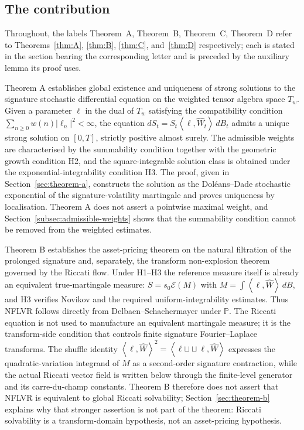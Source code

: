 \documentclass[11pt,oneside]{article}
\theoremstyle{plain}
\theoremstyle{definition}
\theoremstyle{remark}
\newcommand{\Pp}{\mathbb{P}}
\newcommand{\Tw}{T_w}
\newcommand{\cW}{\widehat W}
\newcommand{\sh}{\mathbin{\sqcup\!\sqcup}}
\newcommand{\abs}[1]{\left\lvert #1\right\rvert}
\newcommand{\inner}[2]{\left\langle #1,#2\right\rangle}
\begin{document}
\subsection{The contribution}

Throughout, the labels Theorem~A, Theorem~B, Theorem~C, Theorem~D refer
to Theorems~\ref{thm:A}, \ref{thm:B}, \ref{thm:C}, and~\ref{thm:D}
respectively; each is stated in the section bearing the corresponding
letter and is preceded by the auxiliary lemma its proof uses.

Theorem A establishes global existence and uniqueness of strong solutions to the signature stochastic differential equation on the weighted tensor algebra space $\Tw$. Given a parameter $\ell$ in the dual of $\Tw$ satisfying the compatibility condition $\sum_{n\geq0} w(n)\abs{\ell_n}^2<\infty$, the equation $dS_t=S_t\inner{\ell}{\cW_t}\,dB_t$ admits a unique strong solution on $[0,T]$, strictly positive almost surely. The admissible weights are characterised by the summability condition together with the geometric growth condition H2, and the square-integrable solution class is obtained under the exponential-integrability condition H3. The proof, given in Section~\ref{sec:theorem-a}, constructs the solution as the Dol\'eans--Dade stochastic exponential of the signature-volatility martingale and proves uniqueness by localisation. Theorem A does not assert a pointwise maximal weight, and Section~\ref{subsec:admissible-weights} shows that the summability condition cannot be removed from the weighted estimates.

Theorem B establishes the asset-pricing theorem on the natural filtration of the prolonged signature and, separately, the transform non-explosion theorem governed by the Riccati flow. Under H1--H3 the reference measure itself is already an equivalent true-martingale measure: $S=s_0\mathcal E(M)$ with $M=\int\inner{\ell}{\cW}\,dB$, and H3 verifies Novikov and the required uniform-integrability estimates. Thus NFLVR follows directly from Delbaen--Schachermayer under $\Pp$. The Riccati equation is not used to manufacture an equivalent martingale measure; it is the transform-side condition that controls finite signature Fourier--Laplace transforms. The shuffle identity $\inner{\ell}{\cW}^2=\inner{\ell\sh\ell}{\cW}$ expresses the quadratic-variation integrand of $M$ as a second-order signature contraction, while the actual Riccati vector field is written below through the finite-level generator and its carre-du-champ constants. Theorem B therefore does not assert that NFLVR is equivalent to global Riccati solvability; Section~\ref{sec:theorem-b} explains why that stronger assertion is not part of the theorem: Riccati solvability is a transform-domain hypothesis, not an asset-pricing hypothesis.
\end{document}
